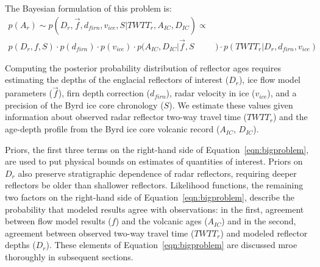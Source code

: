 
The Bayesian formulation of this problem is:
\begin{equation}\label{eqn:bigproblem}
\begin{split} %
p(A_r)  \sim  p(D_r,\vec{f},d_{firn},v_{ice},S | TWTT_r,A_{IC},D_{IC})  \propto & \\
 p(D_r,f,S) \cdot p(d_{firn})\cdot p(v_{ice}) \cdot p(A_{IC},D_{IC} | \vec{f},S&)    \cdot p(TWTT_r | D_r,d_{firn},v_{ice})
\end{split}
\end{equation}

Computing the posterior probability distribution of reflector ages requires estimating the depths of the englacial reflectors of interest ($D_r$), ice flow model parameters ($\vec{f}$), firn depth correction ($d_{firn}$), radar velocity in ice ($v_{ice}$), and a precision of the Byrd ice core chronology ($S$). We estimate these values given information about observed radar reflector two-way travel time ($TWTT_r$) and the age-depth profile from the Byrd ice core volcanic record ($A_{IC}$, $D_{IC}$). 


Priors, the first three terms on the right-hand side of Equation~\ref{eqn:bigproblem}, are used to put physical bounds on estimates of quantities of interest. Priors on ${D_r}$ also preserve stratigraphic dependence of radar reflectors, requiring deeper reflectors be older than shallower reflectors. Likelihood functions, the remaining two factors on the right-hand side of Equation~\ref{eqn:bigproblem}, describe the probability that modeled results agree with observations: in the first, agreement between flow model results ($f$) and the volcanic ages ($A_{IC}$) and in the second, agreement between observed two-way travel time ($TWTT_r$) and modeled reflector depths ($D_r$). These elements of Equation~\ref{eqn:bigproblem} are discussed mroe thoroughly in subsequent sections.

